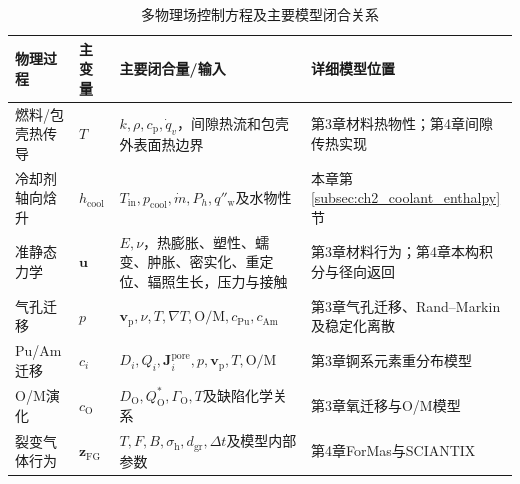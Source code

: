 \begin{table}[htbp]
	\centering
	\caption{多物理场控制方程及主要模型闭合关系}
	\label{tab:ch2_closure_map}
	\begin{tabularx}{\textwidth}{
		>{\centering\arraybackslash}p{2.1cm}
		>{\centering\arraybackslash}p{2.0cm}
		>{\raggedright\arraybackslash}p{5.0cm}
		>{\raggedright\arraybackslash}X}
		\toprule
		物理过程 & 主变量                                                                                                             & 主要闭合量/输入 & 详细模型位置 \\
		\midrule
		燃料/包壳热传导
		     & $T$
		     & $k,\rho,c_{\mathrm p},\dot q_v$，间隙热流和包壳外表面热边界
		     & 第3章材料热物性；第4章间隙传热实现                                                                                                                  \\
		冷却剂轴向{\rarecharfont 焓}升
		     & $h_{\mathrm{cool}}$
		     & $T_{\mathrm{in}},p_{\mathrm{cool}},\dot m,P_h,q''_{\mathrm w}$及水物性
		     & 本章第\ref{subsec:ch2_coolant_enthalpy}节                                                                                               \\
		准静态力学
		     & $\mathbf u$
		     & $E,\nu$，热膨胀、塑性、蠕变、肿胀、密实化、重定位、辐照生长，压力与接触
		     & 第3章材料行为；第4章本构积分与径向返回                                                                                                                \\
		气孔迁移
		     & $p$
		     & $\mathbf v_{\mathrm p},\nu,T,\nabla T,\mathrm{O/M},c_{\mathrm{Pu}},c_{\mathrm{Am}}$
		     & 第3章气孔迁移、Rand--Markin及稳定化离散                                                                                                          \\
		Pu/Am迁移
		     & $c_i$
		     & $D_i,Q_i,\mathbf J_i^{\mathrm{pore}},p,\mathbf v_{\mathrm p},T,\mathrm{O/M}$
		     & 第3章锕系元素重分布模型                                                                                                                        \\
		O/M演化
		     & $c_{\mathrm O}$
		     & $D_{\mathrm O},Q_{\mathrm O}^{*},\Gamma_{\mathrm O},T$及缺陷化学关系
		     & 第3章氧迁移与O/M模型                                                                                                                        \\
		裂变气体行为
		     & $\mathbf z_{\mathrm{FG}}$
		     & $T,F,B,\sigma_{\mathrm h},d_{\mathrm{gr}},\Delta t$及模型内部参数
		     & 第4章ForMas与SCIANTIX                                                                                                                  \\

\end{tabularx}
\end{table}
